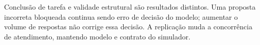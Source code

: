 Conclusão de tarefa e validade estrutural são resultados distintos. Uma proposta incorreta bloqueada continua sendo erro de decisão do modelo; aumentar o volume de respostas não corrige essa decisão. A replicação muda a concorrência de atendimento, mantendo modelo e contrato do simulador.
